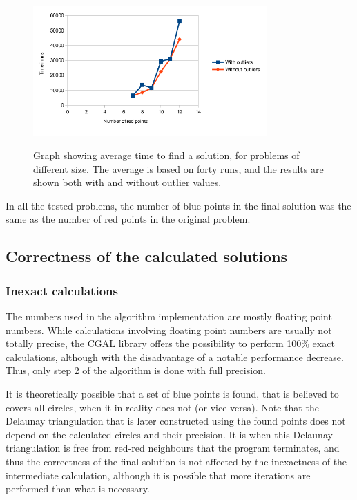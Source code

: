 \documentclass[a4paper,12pt]{article}
\begin{document}
\begin{figure}[h]
\begin{center}
\label{ref:speed}
\includegraphics[width=0.8\textwidth]{pictures/speedStats.png}
 \caption[Close up of \textit{Hemidactylus} sp.]
   {Graph showing average time to find a solution, for problems of different size. The average is based on forty runs, and the results are shown both with and without outlier values.}
\end{center}
\end{figure}


In all the tested problems, the number of blue points in the final solution was the same as the number of red points in the original problem.


\subsection{Correctness of the calculated solutions}
\subsubsection{Inexact calculations}

The numbers used in the algorithm implementation are mostly floating point numbers. While calculations involving floating point numbers are usually not totally precise, the CGAL library offers the possibility to perform 100\% exact calculations, although with the disadvantage of a notable performance decrease. Thus, only step 2 of the algorithm is done with full precision.

It is theoretically possible that a set of blue points is found, that is believed to covers all circles, when it in reality does not (or vice versa). Note that the Delaunay triangulation that is later constructed using the found points does not depend on the calculated circles and their precision. It is when this Delaunay triangulation is free from red-red neighbours that the program terminates, and thus the correctness of the final solution is not affected by the inexactness of the intermediate calculation, although it is possible that more iterations are performed than what is necessary.
\end{document}
